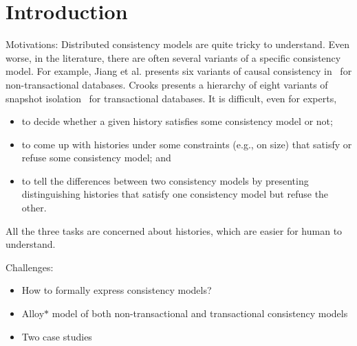
\section{Introduction} \label{section:intro}

Motivations:
Distributed consistency models are quite tricky to understand.
Even worse, in the literature, there are often several variants of a specific consistency model.
For example, Jiang et al. presents six variants of causal consistency in~\cite{SpecFramework:SRDS2020} for non-transactional databases.
Crooks presents a hierarchy of eight variants of snapshot isolation~\cite{Crooks:PODC2017} for transactional databases.
It is difficult, even for experts,
\begin{itemize}
  \item to decide whether a given history satisfies some consistency model or not;
  \item to come up with histories under some constraints (e.g., on size)
    that satisfy or refuse some consistency model; and
  \item to tell the differences between two consistency models
    by presenting distinguishing histories that satisfy one consistency model but refuse the other.
\end{itemize}
All the three tasks are concerned about histories, which are easier for human to understand.


Challenges:
\begin{itemize}
  \item How to formally express consistency models?
\end{itemize}

\begin{itemize}
  \item Alloy$\ast$ model of both non-transactional and transactional consistency models
  \item Two case studies
\end{itemize}
